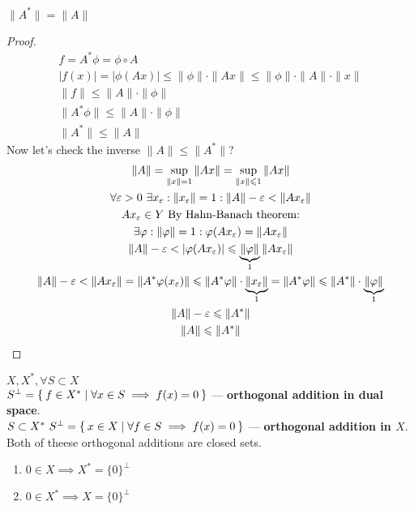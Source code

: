 \begin{stm}
  $\|A^*\| = \|A\|$
\end{stm}

\begin{proof} 
  \begin{gather*}
    f = A^* \phi = \phi \circ A \\
    |f(x)| = |\phi (Ax)| \leq \|\phi\| \cdot \|Ax\| \leq \|\phi\| \cdot \|A\| \cdot \|x\| \\
    \|f\| \leq \|A\| \cdot \|\phi\| \\
    \|A^*\phi\| \leq \|A\| \cdot \|\phi\|\\
    \|A^*\| \leq \|A\|
  \end{gather*}
  Now let's check the inverse $\|A\| \leq \|A^*\|$?
  \begin{gather*}
    \|A\| = \sup_{\|x\| = 1} \|Ax\| = \sup_{\|x\| \leq 1} \|Ax\| \\
    \forall \epsilon > 0\ \exists x_\epsilon : \|x_\epsilon\| = 1 : \|A\| -
    \epsilon < \|A x_\epsilon\| \\
    Ax_\epsilon \in Y\ \text{By Hahn-Banach theorem:} \\
    \exists \phi : \|\phi\| = 1 : \phi(Ax_\epsilon) = \|Ax_\epsilon\| \\
    \|A\| - \epsilon < |\phi(Ax_\epsilon)| \leq \underbrace{\|\phi\|}_{1} \|Ax_\epsilon\| \\
    \|A\| - \epsilon < \|A x_\epsilon\| = \|A^* \phi(x_\epsilon)\| \leq \|A^*
    \phi\| \cdot \underbrace{\|x_\epsilon\|}_{1} = \|A^*\phi\| \leq \|A^*\| \cdot
    \underbrace{\|\phi\|}_{1} \\
    \|A\| - \epsilon \leq \|A^*\| \\
    \|A\| \leq \|A^*\| \qedhere
  \end{gather*}
\end{proof}

\begin{defn}
  $X, X^*, \forall S \subset X$ \\
  $S^\perp = \Set{f \in X^* | \forall x \in S \implies f(x) = 0}$ ---
  \textbf{orthogonal addition in dual space}. \\
  $S \subset X^*\ S^\perp = \Set{x \in X | \forall f \in S \implies f(x) = 0}$
  --- \textbf{orthogonal addition in $X$}.\\
  Both of theese orthogonal additions are closed sets.
\end{defn}

\begin{stm}\leavevmode
  \begin{enumerate}
  \item $0 \in X \implies X^* = \{0\}^\perp$
  \item $0 \in X^* \implies X = \{0\}^\perp$
  \end{enumerate}
\end{stm}

